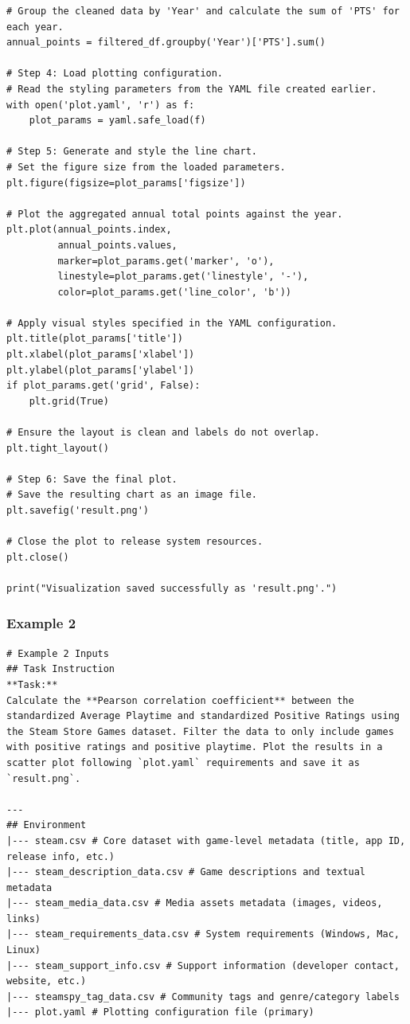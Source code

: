 \documentclass[11pt, a4paper, logo, copyright]{googlecloud}
\begin{document}
\begin{verbatim}
# Group the cleaned data by 'Year' and calculate the sum of 'PTS' for each year.
annual_points = filtered_df.groupby('Year')['PTS'].sum()

# Step 4: Load plotting configuration.
# Read the styling parameters from the YAML file created earlier.
with open('plot.yaml', 'r') as f:
    plot_params = yaml.safe_load(f)

# Step 5: Generate and style the line chart.
# Set the figure size from the loaded parameters.
plt.figure(figsize=plot_params['figsize'])

# Plot the aggregated annual total points against the year.
plt.plot(annual_points.index, 
         annual_points.values,
         marker=plot_params.get('marker', 'o'),
         linestyle=plot_params.get('linestyle', '-'),
         color=plot_params.get('line_color', 'b'))

# Apply visual styles specified in the YAML configuration.
plt.title(plot_params['title'])
plt.xlabel(plot_params['xlabel'])
plt.ylabel(plot_params['ylabel'])
if plot_params.get('grid', False):
    plt.grid(True)

# Ensure the layout is clean and labels do not overlap.
plt.tight_layout()

# Step 6: Save the final plot.
# Save the resulting chart as an image file.
plt.savefig('result.png')

# Close the plot to release system resources.
plt.close()

print("Visualization saved successfully as 'result.png'.")
\end{verbatim}


\subsubsection{Example 2}
\begin{verbatim}
# Example 2 Inputs
## Task Instruction
**Task:**  
Calculate the **Pearson correlation coefficient** between the standardized Average Playtime and standardized Positive Ratings using the Steam Store Games dataset. Filter the data to only include games with positive ratings and positive playtime. Plot the results in a scatter plot following `plot.yaml` requirements and save it as `result.png`.

---
## Environment
|--- steam.csv # Core dataset with game-level metadata (title, app ID, release info, etc.)
|--- steam_description_data.csv # Game descriptions and textual metadata
|--- steam_media_data.csv # Media assets metadata (images, videos, links)
|--- steam_requirements_data.csv # System requirements (Windows, Mac, Linux)
|--- steam_support_info.csv # Support information (developer contact, website, etc.)
|--- steamspy_tag_data.csv # Community tags and genre/category labels
|--- plot.yaml # Plotting configuration file (primary)
\end{verbatim}
\end{document}
